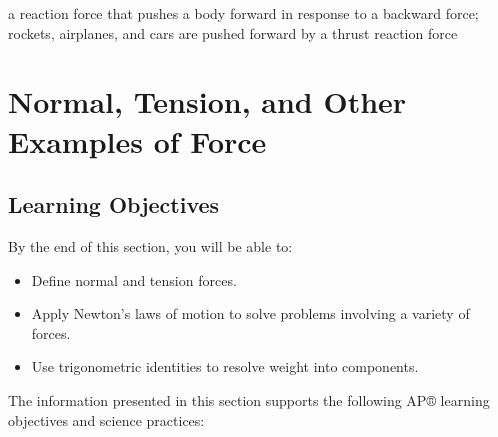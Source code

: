 \documentclass[
]{book}
\providecommand{\tightlist}{%
  \setlength{\itemsep}{0pt}\setlength{\parskip}{0pt}}
\newenvironment{learning-objectives}{}{}
\begin{document}
\begin{description}
\tightlist
\item[thrust]
a reaction force that pushes a body forward in response to a
backward force; rockets, airplanes, and cars are pushed forward by a
thrust reaction force
\end{description}

\hypertarget{normal-tension-and-other-examples-of-force}{%
\section{Normal, Tension, and Other Examples of Force}\label{normal-tension-and-other-examples-of-force}}

\hypertarget{fs-id1904445}{}
\begin{learning-objectives}

\hypertarget{learning-objectives-17}{%
\subsection{Learning Objectives}\label{learning-objectives-17}}

By the end of this section, you will be able to:

\begin{itemize}
\tightlist
\item
  Define normal and tension forces.
\item
  Apply Newton's laws of motion to solve problems involving a variety
  of forces.
\item
  Use trigonometric identities to resolve weight into components.
\end{itemize}

The information presented in this section supports the following AP®
learning objectives and science practices:


\end{learning-objectives}
\end{document}
